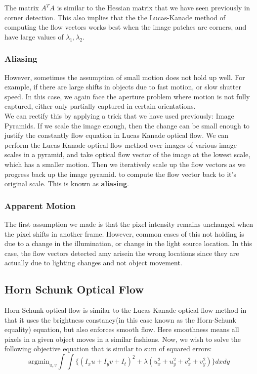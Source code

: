 \documentclass[12pt]{article}
\begin{document}
The matrix $A^TA$ is similar to the Hessian matrix that we have seen previously in corner detection. This also implies that the the Lucas-Kanade method of computing the flow vectors works best when the image patches are corners, and have large values of $\lambda_1, \lambda_2$.

\subsubsection{Aliasing}

However, sometimes the assumption of small motion does not hold up well. For example, if there are large shifts in objects due to fast motion, or slow shutter speed. In this case, we again face the aperture problem where motion is not fully captured, either only partially captured in certain orientations.\\

We can rectify this by applying a trick that we have used previously: Image Pyramids. If we scale the image enough, then the change can be small enough to justify the constantly flow equation in Lucas Kanade optical flow.
We can perform the Lucas Kanade optical flow method over images of various image scales in a pyramid, and take optical flow vector of the image at the lowest scale, which has a smaller motion. Then we iteratively scale up the flow vectors as we progress back up the image pyramid. to compute the flow vector back to it's original scale. This is known as \textbf{aliasing}.

\subsubsection{Apparent Motion}

The first assumption we made is that the pixel intensity remains unchanged when the pixel shifts in another frame. However, common cases of this not holding is due to a change in the illumination, or change in the light source location. In this case, the flow vectors detected amy arisein the wrong locations since they are actually due to lighting changes and not object movement.

\subsection{Horn Schunk Optical Flow}

Horn Schunk optical flow is similar to the Lucas Kanade optical flow method in that it uses the brightness constancy(in this case known as the Horn-Schunk equality) equation, but also enforces smooth flow. Here smoothness means all pixels in a given object moves in a similar fashions. Now, we wish to solve the following objective equation that is similar to sum of squared errors:
\begin{equation*}
\text{argmin}_{u, v} \int \int \{ (I_xu + I_yv + I_t)^2 + \lambda (u_x^2 + u_y^2 + v_x^2 + v_y^2) \} dxdy
\end{equation*}
\end{document}
